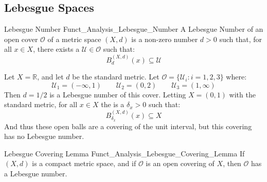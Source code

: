 \documentclass[crop=false,class=book,oneside]{standalone}                      %
\begin{document}
        \subsection{Lebesgue Spaces}
            \begin{ldefinition}{Lebesgue Number}
                  {Funct_Analysis_Lebesgue_Number}
                A Lebesgue Number of an open cover
                $\mathcal{O}$ of a metric space $(X,d)$ is
                a non-zero number $d>0$ such that, for all
                $x\in{X}$, there exists
                a $\mathcal{U}\in\mathcal{O}$ such that:
                \begin{equation}
                    B_{d}^{(X,d)}(x)\subseteq\mathcal{U}
                \end{equation}
            \end{ldefinition}
            \begin{lexample}
                Let $X=\mathbb{R}$, and let $d$ be the
                standard metric. Let
                $\mathcal{O}=\{\mathcal{U}_{i}:i=1,2,3\}$ where:
                \begin{equation}
                    \mathcal{U}_{1}=(-\infty,1)
                    \quad\quad
                    \mathcal{U}_{2}=(0,2)
                    \quad\quad
                    \mathcal{U}_{3}=(1,\infty)
                \end{equation}
                Then $d=1/2$ is a Lebesgue number of this cover.
                Letting $X=(0,1)$ with the standard metric, for all
                $x\in{X}$ the is a $\delta_{x}>0$ such that:
                \begin{equation}
                    B_{\delta_{x}}^{(X,d)}(x)
                    \subseteq{X}
                \end{equation}
                And thus these open balls are a covering of the unit
                interval, but this covering has no Lebesgue number.
            \end{lexample}
            \begin{ltheorem}{Lebesgue Covering Lemma}
                  {Funct_Analysis_Lebesgue_Covering_Lemma}
                If $(X,d)$ is a compact metric space, and if
                $\mathcal{O}$ is an open covering of $X$, then
                $\mathcal{O}$ has a Lebesgue number.
            \end{ltheorem}
\end{document}

